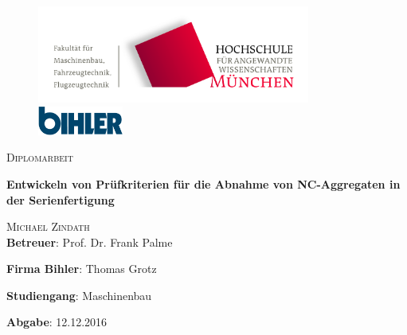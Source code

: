 \begin{titlepage}
\setcounter{page}{1}
\begin{center}
\begin{figure}[h!]
\vspace{0cm}
\centering
\includegraphics[width=0.8\textwidth]{bilder/FK03_CMYK_Block.png}
\\[0.8cm]
\includegraphics[width=0.25\textwidth]{bilder/Bihler_Logo.png}
\end{figure}
\vspace{1.5cm}

{\fontsize{20}{60}\scshape Diplomarbeit} 
\\[1.1cm]

\begin{doublespace}
{\fontsize{30}{22}\selectfont \textbf{Entwickeln von Prüfkriterien für die Abnahme von NC-Aggregaten in der Serienfertigung}\par} 
\vspace{1.4cm}
\end{doublespace}

{\fontsize{23}{60}\scshape Michael Zindath} 
\\[2.0cm]


\textbf{Betreuer}: Prof. Dr. Frank Palme

\textbf{Firma Bihler}: Thomas Grotz


\textbf{Studiengang}: Maschinenbau

\textbf{Abgabe}: 12.12.2016

\vfill


\end{center}
\end{titlepage}


